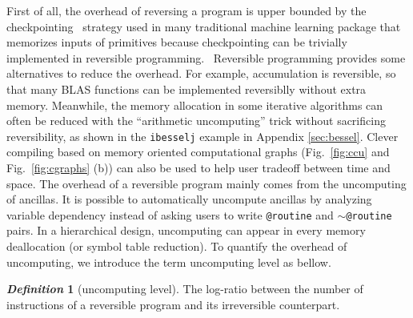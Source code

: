 \documentclass{article}
\newcommand{\<}{\langle}
\renewcommand{\>}{\rangle}
\newcommand{\Fig}[1]{Fig.~\ref{#1}}
\newcommand{\App}[1]{Appendix \ref{#1}}
\theoremstyle{definition}\newtheorem{definition}{\textit{Definition}}
\begin{document}
First of all, the overhead of reversing a program is upper bounded by the checkpointing~\cite{Chen2016} strategy used in many traditional machine learning package that memorizes inputs of primitives because checkpointing can be trivially implemented in reversible programming.~\cite{Perumalla2013} 
Reversible programming provides some alternatives to reduce the overhead.
For example, accumulation is reversible, so that many BLAS functions can be implemented reversiblly without extra memory.
Meanwhile, the memory allocation in some iterative algorithms can often be reduced with the ``arithmetic uncomputing'' trick without sacrificing reversibility, as shown in the \texttt{ibesselj} example in \App{sec:bessel}.
Clever compiling based on memory oriented computational graphs (\Fig{fig:ccu} and \Fig{fig:cgraphs} (b)) can also be used to help user tradeoff between time and space.
The overhead of a reversible program mainly comes from the uncomputing of ancillas.
It is possible to automatically uncompute ancillas by analyzing variable dependency instead of asking users to write \texttt{@routine} and \texttt{$\sim$@routine} pairs.
In a hierarchical design, uncomputing can appear in every memory deallocation (or symbol table reduction). To quantify the overhead of uncomputing, we introduce the term uncomputing level as bellow.
\begin{definition}[uncomputing level]
    The log-ratio between the number of instructions of a reversible program and its irreversible counterpart.
\end{definition}
\end{document}
